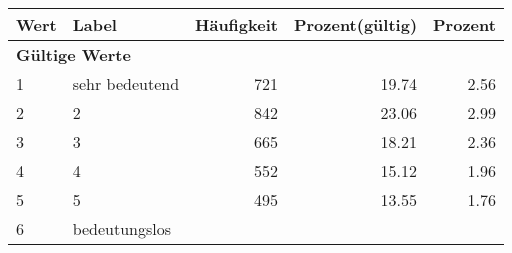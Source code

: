      \begin{longtable}{lXrrr}
     \toprule
     \textbf{Wert} & \textbf{Label} & \textbf{Häufigkeit} & \textbf{Prozent(gültig)} & \textbf{Prozent} \\
     \endhead
     \midrule
     \multicolumn{5}{l}{\textbf{Gültige Werte}}\\

     1 &
     \multicolumn{1}{X}{ sehr bedeutend   } &


       \num{721} &
       \num[round-mode=places,round-precision=2]{19.74} &
         \num[round-mode=places,round-precision=2]{2.56} \\

     2 &
     \multicolumn{1}{X}{ 2   } &


       \num{842} &
       \num[round-mode=places,round-precision=2]{23.06} &
         \num[round-mode=places,round-precision=2]{2.99} \\

     3 &
     \multicolumn{1}{X}{ 3   } &


       \num{665} &
       \num[round-mode=places,round-precision=2]{18.21} &
         \num[round-mode=places,round-precision=2]{2.36} \\

     4 &
     \multicolumn{1}{X}{ 4   } &


       \num{552} &
       \num[round-mode=places,round-precision=2]{15.12} &
         \num[round-mode=places,round-precision=2]{1.96} \\

     5 &
     \multicolumn{1}{X}{ 5   } &


       \num{495} &
       \num[round-mode=places,round-precision=2]{13.55} &
         \num[round-mode=places,round-precision=2]{1.76} \\

     6 &
     \multicolumn{1}{X}{ bedeutungslos   } &



\end{longtable}

